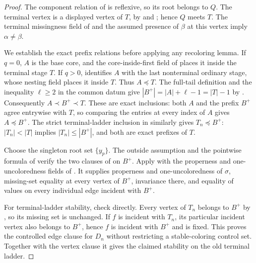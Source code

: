 \begin{proof}
The component relation of  is reflexive,
so its root belongs to $Q$. The terminal vertex is a displayed vertex
of $T$, by  and
; hence $Q$ meets $T$.
The terminal missingness field of
 and the assumed presence
of $\beta$ at this vertex imply $\alpha\ne\beta$.

We establish the exact prefix relations before applying any recoloring
lemma. If $q=0$, $A$ is the base core, and the core-inside-first field of
 places it inside the terminal stage $T$.
If $q>0$,  identifies $A$ with the last
nonterminal ordinary stage, whose nesting field places it inside $T$.
Thus $A\preccurlyeq T$. The full-tail definition
 and the inequality $\ell\ge2$ in the
common datum give
$|B^+|=|A|+\ell-1=|T|-1$ by
. Consequently $A\prec B^+\prec T$.
These are exact inclusions: both $A$ and the prefix $B^+$ agree entrywise
with $T$, so comparing the entries at every index of $A$ gives
$A\preccurlyeq B^+$. The strict terminal-ladder inclusion in
 similarly gives $T_n\preccurlyeq B^+$:
$|T_n|<|T|$ implies $|T_n|\le |B^+|$, and both are exact prefixes of $T$.

Choose the singleton root set $\{y_p\}$. The outside assumption and
the pointwise formula of  verify the two
clauses of  on $B^+$. Apply
 with the properness and
one-uncoloredness fields of
. It supplies properness
and one-uncoloredness of $\sigma$, missing-set equality at every vertex
of $B^+$, invariance there, and equality of values on every individual
edge incident with $B^+$.

For terminal-ladder stability, check  directly.
Every vertex of $T_n$ belongs to $B^+$ by
, so its missing
set is unchanged. If $f$ is incident with $T_n$, its particular incident
vertex also belongs to $B^+$, hence $f$ is incident with $B^+$ and is fixed.
This proves the controlled edge clause for $D_n$ without restricting a
stable-coloring control set. Together with the vertex clause it gives the
claimed stability on the old terminal ladder.


\end{proof}
